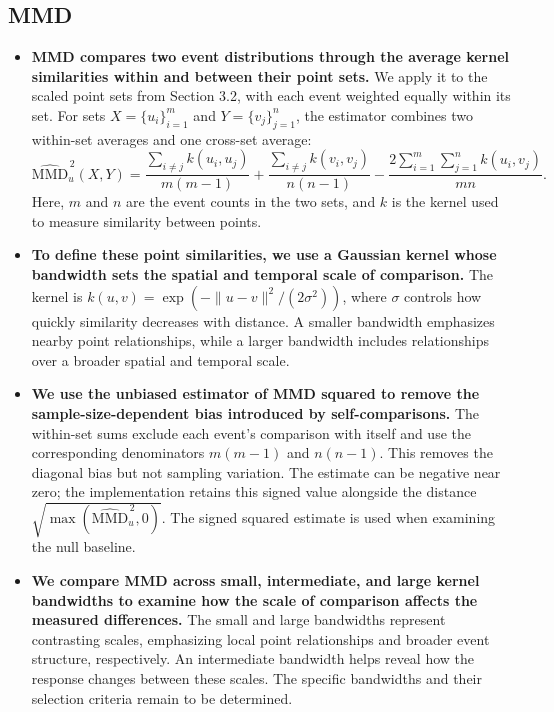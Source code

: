 \subsection{MMD}

\begin{itemize}
  \item \textbf{MMD compares two event distributions through the average kernel similarities within and between their point sets.} We apply it to the scaled point sets from Section 3.2, with each event weighted equally within its set. For sets $X=\{u_i\}_{i=1}^{m}$ and $Y=\{v_j\}_{j=1}^{n}$, the estimator combines two within-set averages and one cross-set average:
  \[
    \widehat{\mathrm{MMD}}_u^{\,2}(X,Y)
    = \frac{\sum_{i\ne j} k(u_i,u_j)}{m(m-1)}
    + \frac{\sum_{i\ne j} k(v_i,v_j)}{n(n-1)}
    - \frac{2\sum_{i=1}^{m}\sum_{j=1}^{n} k(u_i,v_j)}{mn}.
  \]
  Here, $m$ and $n$ are the event counts in the two sets, and $k$ is the kernel used to measure similarity between points. \cite{gretton2012kernel}

  \item \textbf{To define these point similarities, we use a Gaussian kernel whose bandwidth sets the spatial and temporal scale of comparison.} The kernel is $k(u,v)=\exp(-\|u-v\|^2/(2\sigma^2))$, where $\sigma$ controls how quickly similarity decreases with distance. A smaller bandwidth emphasizes nearby point relationships, while a larger bandwidth includes relationships over a broader spatial and temporal scale.

  \item \textbf{We use the unbiased estimator of MMD squared to remove the sample-size-dependent bias introduced by self-comparisons.} The within-set sums exclude each event's comparison with itself and use the corresponding denominators $m(m-1)$ and $n(n-1)$. This removes the diagonal bias but not sampling variation. The estimate can be negative near zero; the implementation retains this signed value alongside the distance $\sqrt{\max(\widehat{\mathrm{MMD}}_u^{\,2},0)}$. The signed squared estimate is used when examining the null baseline.

  \item \textbf{We compare MMD across small, intermediate, and large kernel bandwidths to examine how the scale of comparison affects the measured differences. } The small and large bandwidths represent contrasting scales, emphasizing local point relationships and broader event structure, respectively. An intermediate bandwidth helps reveal how the response changes between these scales. The specific bandwidths and their selection criteria remain to be determined.
\end{itemize}

